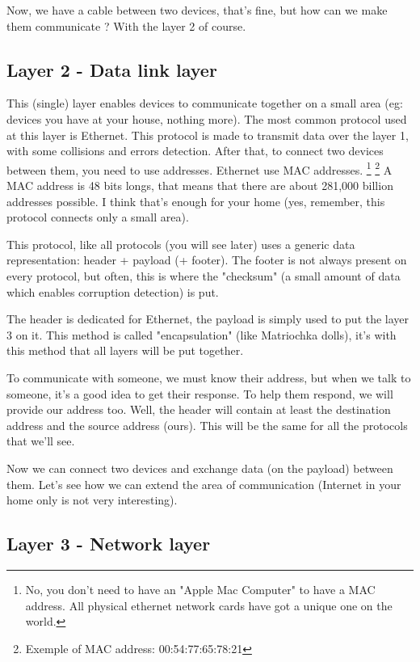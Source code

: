 \documentclass{article}
\begin{document}
	Now, we have a cable between two devices, that's fine, but how can we make them communicate ?
	With the layer 2 of course.

	\subsection{Layer 2 - Data link layer}
	
	This (single) layer enables devices to communicate together on a small area (eg: devices you have at your house,
	nothing more). The most common protocol used at this layer is Ethernet. This protocol is made to transmit data
	over the layer 1, with some collisions and errors detection. After that, to connect two devices between them, you
	need to use addresses. Ethernet use MAC addresses.
	\footnote{No, you don't need to have an "Apple Mac Computer" to have a MAC address.
	All physical ethernet network cards have got a unique one on the world.}
	\footnote{Exemple of MAC address: 00:54:77:65:78:21}
	A MAC address is 48 bits longs, that means that there are about 281,000 billion addresses possible. I think that's
	enough for your home (yes, remember, this protocol connects only a small area).
	
	This protocol, like all protocols (you will see later) uses a generic data representation:
	header + payload (+ footer).
	The footer is not always present on every protocol, but often, this is where the "checksum" (a small amount of data
	which enables corruption detection) is put.
	
	The header is dedicated for Ethernet, the payload is simply used to put
	the layer 3 on it. This method is called "encapsulation" (like Matriochka dolls), it's with this method that all layers
	will be put together.
	
	To communicate with someone, we must know their address, but when we talk to someone, it's a good idea to
	get their response. To help them respond, we will provide our address too. Well, the header will contain
	at least the destination address and the source address (ours). This will be the same for all the protocols
	that we'll see.
	
	Now we can connect two devices and exchange data (on the payload) between them. Let's see how we can extend
	the area of communication (Internet in your home only is not very interesting).
	
	\subsection{Layer 3 - Network layer}
	
\end{document}
